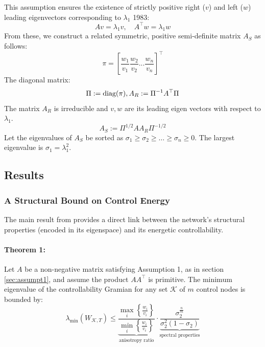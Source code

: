 \documentclass[11pt, a4paper]{article}
\begin{document}
This assumption ensures the existence of strictly positive right ($v$) and left ($w$) leading eigenvectors corresponding to $\lambda_1$ {1983}:
\begin{equation}
    Av = \lambda_1 v, \quad A^{\top}w = \lambda_1 w
    \label{eq:eigenvectors}
\end{equation}
From these, we construct a related symmetric, positive semi-definite matrix $A_S$ as follows:
\begin{equation}
    \pi= [\frac{w_1}{v_1}\frac{w_2}{v_2} ...\frac{w_n}{v_n}]^{\top}
\end{equation}
The diagonal matrix: \\
\begin{equation}
\Pi:= \text{diag}(\pi) \\
,A_R:= \Pi^{-1}A^{\top}\Pi \quad  \\
\end{equation}
The matrix $A_R$  is irreducible and $v,w$ are its leading eigen vectors with respect to $\lambda_1$.
\begin{equation}
A_S:= \Pi^{1/2} A A_R \Pi^{-1/2}
\end{equation}
Let the eigenvalues of $A_S$ be sorted as $\sigma_1 \ge \sigma_2 \ge \dots \ge \sigma_n \ge 0$. The largest eigenvalue is $\sigma_1 = \lambda_1^2$.
\subsection{Results}

\subsubsection{A Structural Bound on Control Energy}
The main result from provides a direct link between the network's structural properties (encoded in its eigenspace) and its energetic controllability.

\paragraph{Theorem 1:} Let $A$ be a non-negative matrix satisfying Assumption 1, as in section \ref{sec:assumpt1}, and assume the product $AA^{\top}$ is primitive. The minimum eigenvalue of the controllability Gramian for any set $\mathcal{K}$ of $m$ control nodes is bounded by:
\begin{equation}
    \lambda_{\min}(W_{\mathcal{K},T}) 
    \le 
    \underbrace{
        \frac{\max_{i}\left\{\frac{w_{i}}{v_{i}}\right\}}{\min_{i}\left\{\frac{w_{i}}{v_{i}}\right\}}
    }_{\text{anisotropy ratio}}
    \cdot
    \underbrace{
        \frac{\sigma_{2}^{\frac{n}{m} }}{\sigma_2^2(1 - \sigma_{2})}
    }_{\text{spectral properties}}
    \label{eq:main_bound}
\end{equation}
\end{document}

